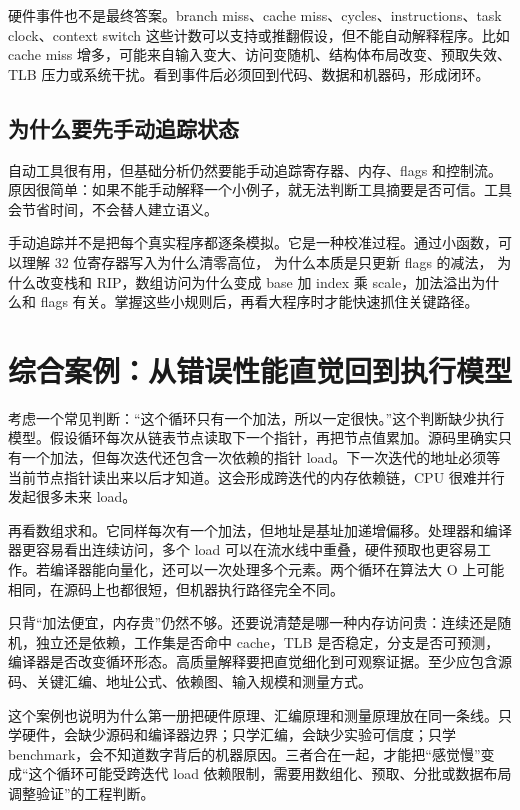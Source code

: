 硬件事件也不是最终答案。branch miss、cache miss、cycles、instructions、task clock、context switch 这些计数可以支持或推翻假设，但不能自动解释程序。比如 cache miss 增多，可能来自输入变大、访问变随机、结构体布局改变、预取失效、TLB 压力或系统干扰。看到事件后必须回到代码、数据和机器码，形成闭环。

\subsection{为什么要先手动追踪状态}

自动工具很有用，但基础分析仍然要能手动追踪寄存器、内存、flags 和控制流。原因很简单：如果不能手动解释一个小例子，就无法判断工具摘要是否可信。工具会节省时间，不会替人建立语义。

手动追踪并不是把每个真实程序都逐条模拟。它是一种校准过程。通过小函数，可以理解 32 位寄存器写入为什么清零高位， 为什么本质是只更新 flags 的减法， 为什么改变栈和 RIP，数组访问为什么变成 base 加 index 乘 scale，加法溢出为什么和 flags 有关。掌握这些小规则后，再看大程序时才能快速抓住关键路径。

\section{综合案例：从错误性能直觉回到执行模型}

考虑一个常见判断：“这个循环只有一个加法，所以一定很快。”这个判断缺少执行模型。假设循环每次从链表节点读取下一个指针，再把节点值累加。源码里确实只有一个加法，但每次迭代还包含一次依赖的指针 load。下一次迭代的地址必须等当前节点指针读出来以后才知道。这会形成跨迭代的内存依赖链，CPU 很难并行发起很多未来 load。

再看数组求和。它同样每次有一个加法，但地址是基址加递增偏移。处理器和编译器更容易看出连续访问，多个 load 可以在流水线中重叠，硬件预取也更容易工作。若编译器能向量化，还可以一次处理多个元素。两个循环在算法大 O 上可能相同，在源码上也都很短，但机器执行路径完全不同。

只背“加法便宜，内存贵”仍然不够。还要说清楚是哪一种内存访问贵：连续还是随机，独立还是依赖，工作集是否命中 cache，TLB 是否稳定，分支是否可预测，编译器是否改变循环形态。高质量解释要把直觉细化到可观察证据。至少应包含源码、关键汇编、地址公式、依赖图、输入规模和测量方式。

这个案例也说明为什么第一册把硬件原理、汇编原理和测量原理放在同一条线。只学硬件，会缺少源码和编译器边界；只学汇编，会缺少实验可信度；只学 benchmark，会不知道数字背后的机器原因。三者合在一起，才能把“感觉慢”变成“这个循环可能受跨迭代 load 依赖限制，需要用数组化、预取、分批或数据布局调整验证”的工程判断。

